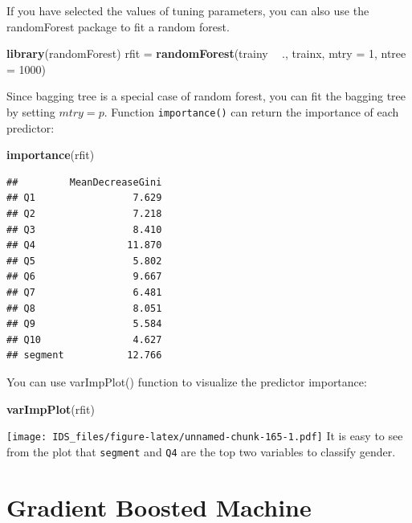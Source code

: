 \documentclass[12pt,]{krantz}
\makeatletter
\newenvironment{Shaded}{\begin{snugshade}}{\end{snugshade}}
\newcommand{\DataTypeTok}[1]{\textcolor[rgb]{0.27,0.27,0.27}{#1}}
\newcommand{\DecValTok}[1]{\textcolor[rgb]{0.06,0.06,0.06}{#1}}
\newcommand{\KeywordTok}[1]{\textcolor[rgb]{0.27,0.27,0.27}{\textbf{#1}}}
\newcommand{\NormalTok}[1]{#1}
\newcommand{\OperatorTok}[1]{\textcolor[rgb]{0.43,0.43,0.43}{\textbf{#1}}}
\newcommand{\StringTok}[1]{\textcolor[rgb]{0.5,0.5,0.5}{#1}}
\newenvironment{kframe}{%
\medskip{}
\setlength{\fboxsep}{.8em}
 \def\at@end@of@kframe{}%
 \ifinner\ifhmode%
  \def\at@end@of@kframe{\end{minipage}}%
  \begin{minipage}{\columnwidth}%
 \fi\fi%
 \def\FrameCommand##1{\hskip\@totalleftmargin \hskip-\fboxsep
 \colorbox{shadecolor}{##1}\hskip-\fboxsep
     \hskip-\linewidth \hskip-\@totalleftmargin \hskip\columnwidth}%
 \MakeFramed {\advance\hsize-\width
   \@totalleftmargin\z@ \linewidth\hsize
   \@setminipage}}%
 {\par\unskip\endMakeFramed%
 \at@end@of@kframe}
\renewenvironment{Shaded}{\begin{kframe}}{\end{kframe}}
\makeatother
\begin{document}
If you have selected the values of tuning parameters, you can also use the randomForest package to fit a random forest.

\begin{Shaded}
\begin{Highlighting}[]
\KeywordTok{library}\NormalTok{(randomForest)}
\NormalTok{rfit =}\StringTok{ }\KeywordTok{randomForest}\NormalTok{(trainy }\OperatorTok{~}\StringTok{ }\NormalTok{., trainx, }\DataTypeTok{mtry =} \DecValTok{1}\NormalTok{, }\DataTypeTok{ntree =} \DecValTok{1000}\NormalTok{)}
\end{Highlighting}
\end{Shaded}

Since bagging tree is a special case of random forest, you can fit the bagging tree by setting \(mtry=p\). Function \texttt{importance()} can return the importance of each predictor:

\begin{Shaded}
\begin{Highlighting}[]
\KeywordTok{importance}\NormalTok{(rfit)}
\end{Highlighting}
\end{Shaded}

\begin{verbatim}
##         MeanDecreaseGini
## Q1                 7.629
## Q2                 7.218
## Q3                 8.410
## Q4                11.870
## Q5                 5.802
## Q6                 9.667
## Q7                 6.481
## Q8                 8.051
## Q9                 5.584
## Q10                4.627
## segment           12.766
\end{verbatim}

You can use varImpPlot() function to visualize the predictor importance:

\begin{Shaded}
\begin{Highlighting}[]
\KeywordTok{varImpPlot}\NormalTok{(rfit)}
\end{Highlighting}
\end{Shaded}

\texttt{[image: IDS\_files/figure-latex/unnamed-chunk-165-1.pdf]}
It is easy to see from the plot that \texttt{segment} and \texttt{Q4} are the top two variables to classify gender.

\hypertarget{gradient-boosted-machine}{%
\section{Gradient Boosted Machine}\label{gradient-boosted-machine}}
\end{document}

